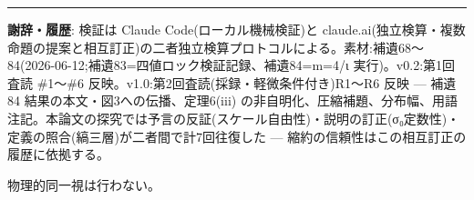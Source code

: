 \documentclass[
]{ltjsarticle}
\begin{document}
\begin{center}\rule{0.5\linewidth}{0.5pt}\end{center}

\textbf{謝辞・履歴}: 検証は Claude Code(ローカル機械検証)と
claude.ai(独立検算・複数命題の提案と相互訂正)の二者独立検算プロトコルによる。素材:補遺68〜84(2026-06-12;補遺83=四値ロック検証記録、補遺84=m=4/ι
実行)。v0.2:第1回査読 \#1〜\#6
反映。v1.0:第2回査読(採録・軽微条件付き)R1〜R6 反映 --- 補遺84
結果の本文・図3への伝播、定理6(iii)
の非自明化、圧縮補題、分布幅、用語注記。本論文の探究では予言の反証(スケール自由性)・説明の訂正(σ₀定数性)・定義の照合(縞三層)が二者間で計7回往復した
--- 縮約の信頼性はこの相互訂正の履歴に依拠する。

物理的同一視は行わない。
\end{document}
